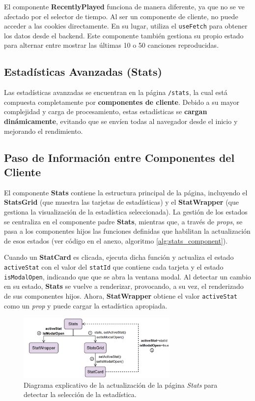 El componente \textbf{RecentlyPlayed} funciona de manera diferente, ya que no se ve afectado por el selector de tiempo. Al ser un componente de cliente, no puede acceder a las cookies directamente. En su lugar, utiliza el \texttt{useFetch} para obtener los datos desde el backend. Este componente también gestiona su propio estado para alternar entre mostrar las últimas 10 o 50 canciones reproducidas.

\subsection{Estadísticas Avanzadas (Stats)}

Las estadísticas avanzadas se encuentran en la página \texttt{/stats}, la cual está compuesta completamente por \textbf{componentes de cliente}. Debido a su mayor complejidad y carga de procesamiento, estas estadísticas se \textbf{cargan dinámicamente}, evitando que se envíen todas al navegador desde el inicio y mejorando el rendimiento.

\subsection*{Paso de Información entre Componentes del Cliente}

El componente \textbf{Stats} contiene la estructura principal de la página, incluyendo el \textbf{StatsGrid} (que muestra las tarjetas de estadísticas) y el \textbf{StatWrapper} (que gestiona la visualización de la estadística seleccionada). La gestión de los estados se centraliza en el componente padre \textbf{Stats}, mientras que, a través de \textit{props}, se pasa a los componentes hijos las funciones definidas que habilitan la actualización de esos estados (ver código en el anexo, algoritmo \ref{alg:stats_component}).

Cuando un \textbf{StatCard} es clicada, ejecuta dicha función y actualiza el estado \texttt{activeStat} con el valor del \texttt{statId} que contiene cada tarjeta y el estado \texttt{isModalOpen}, indicando que que se abra la ventana modal. Al detectar un cambio en su estado, \textbf{Stats} se vuelve a renderizar, provocando, a su vez, el renderizado de sus componentes hijos. Ahora, \textbf{StatWrapper} obtiene el valor \texttt{activeStat} como un \textit{prop} y puede cargar la estadística apropiada.

\begin{figure}[H]
    \centering
    \includegraphics[width=0.7\textwidth]{figures/implementacion/actualizacion_stats.png}
    \vspace{10pt}
    \caption{Diagrama explicativo de la actualización de la página \textit{Stats} para detectar la selección de la estadística.}
    \label{fig:actualizacion_stats}
\end{figure}

